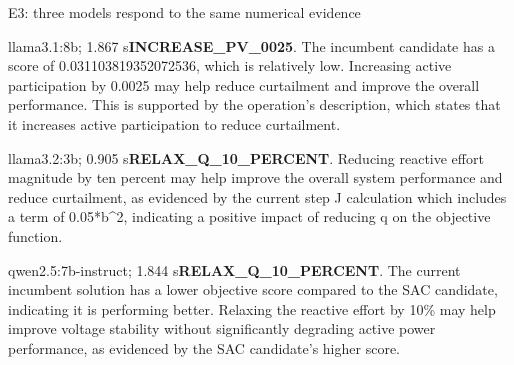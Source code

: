 \begin{frame}[t]{E3: three models respond to the same numerical evidence}

\begin{block}{llama3.1:8b; 1.867 s}\fontsize{7.3}{8.3}\selectfont \textbf{INCREASE\_PV\_0025}. The incumbent candidate has a score of 0.031103819352072536, which is relatively low. Increasing active participation by 0.0025 may help reduce curtailment and improve the overall performance. This is supported by the operation's description, which states that it increases active participation to reduce curtailment.
\end{block}
\begin{block}{llama3.2:3b; 0.905 s}\fontsize{7.3}{8.3}\selectfont \textbf{RELAX\_Q\_10\_PERCENT}. Reducing reactive effort magnitude by ten percent may help improve the overall system performance and reduce curtailment, as evidenced by the current step J calculation which includes a term of 0.05*b\textasciicircum{}2, indicating a positive impact of reducing q on the objective function.
\end{block}
\begin{block}{qwen2.5:7b-instruct; 1.844 s}\fontsize{7.3}{8.3}\selectfont \textbf{RELAX\_Q\_10\_PERCENT}. The current incumbent solution has a lower objective score compared to the SAC candidate, indicating it is performing better. Relaxing the reactive effort by 10\% may help improve voltage stability without significantly degrading active power performance, as evidenced by the SAC candidate's higher score.
\end{block}

\end{frame}

